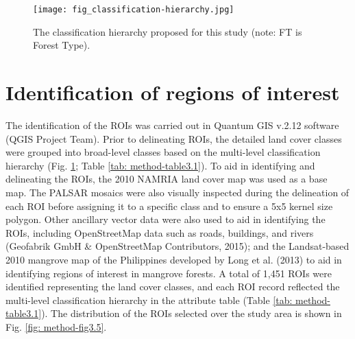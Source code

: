 \begin{figure}
	\centering
	\texttt{[image: fig\_classification-hierarchy.jpg]}
	\caption[The classification hierarchy proposed for this study.]{The classification hierarchy proposed for this study (note: FT is Forest Type).}
	\label{fig: method-fig3.4}
\end{figure}

\section{Identification of regions of interest}
\label{sec: method-roi-identification}

The identification of the ROIs was carried out in Quantum GIS v.2.12 software (QGIS Project Team). Prior to delineating ROIs, the detailed land cover classes were grouped into broad-level classes based on the multi-level classification hierarchy (Fig. \ref{fig: method-fig3.4}; Table \ref{tab: method-table3.1}). To aid in identifying and delineating the ROIs, the 2010 NAMRIA land cover map was used as a base map. The PALSAR mosaics were also visually inspected during the delineation of each ROI before assigning it to a specific class and to ensure a 5x5 kernel size polygon. Other ancillary vector data were also used to aid in identifying the ROIs, including OpenStreetMap data such as roads, buildings, and rivers (Geofabrik GmbH \& OpenStreetMap Contributors, 2015); and the Landsat-based 2010 mangrove map of the Philippines developed by Long et al. (2013) to aid in identifying regions of interest in mangrove forests. A total of 1,451 ROIs were identified representing the land cover classes, and each ROI record reflected the multi-level classification hierarchy in the attribute table (Table \ref{tab: method-table3.1}). The distribution of the ROIs selected over the study area is shown in Fig. \ref{fig: method-fig3.5}.\\

